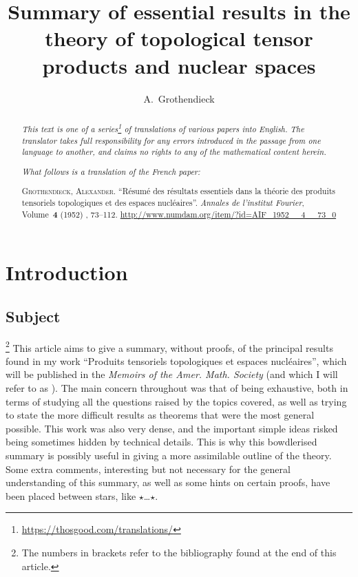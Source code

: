 \documentclass{article}
\title{Summary of essential results in the theory of topological tensor products and nuclear spaces}
\author{A.~Grothendieck}
\date{}
\theoremstyle{plain}
\newcommand{\aster}[1]{$\star${#1}$\star$}
\newcommand{\oldpage}[1]{\marginpar{\footnotesize$\Big\vert$ \textit{p.~#1}}}
\begin{document}
\maketitle
\thispagestyle{fancy}

\renewcommand{\abstractname}{Translator's note.}

\begin{abstract}
  \renewcommand*{\thefootnote}{\fnsymbol{footnote}}
  \emph{This text is one of a series\footnote{\url{https://thosgood.com/translations/}} of translations of various papers into English.}
  \emph{The translator takes full responsibility for any errors introduced in the passage from one language to another, and claims no rights to any of the mathematical content herein.}

  \medskip
  
  \emph{What follows is a translation of the French paper:}

  \medskip\noindent
  \textsc{Grothendieck, Alexander}.
  ``R\'{e}sum\'{e} des r\'{e}sultats essentiels dans la th\'{e}orie des produits tensoriels topologiques et des espaces nucl\'{e}aires''.
  \emph{Annales de l'institut Fourier}, Volume~\textbf{4} (1952) , 73--112.
  {\url{http://www.numdam.org/item/?id=AIF_1952__4__73_0}}
\end{abstract}

\setcounter{footnote}{0}

\tableofcontents
\bigskip



\section*{Introduction}
\label{section:introduction}
%


\subsection*{Subject}
\label{subsection:subject}
%

\oldpage{73}

\footnote{The numbers in brackets refer to the bibliography found at the end of this article.}
This article aims to give a summary, without proofs, of the principal results found in my work ``Produits tensoriels topologiques et espaces nucl\'{e}aires'', which will be published in the \emph{Memoirs of the Amer. Math. Society} (and which I will refer to as \cite{PTT}).
The main concern throughout \cite{PTT} was that of being exhaustive, both in terms of studying all the questions raised by the topics covered, as well as trying to state the more difficult results as theorems that were the most general possible.
This work was also very dense, and the important simple ideas risked being sometimes hidden by technical details.
This is why this bowdlerised summary is possibly useful in giving a more assimilable outline of the theory.
Some extra comments, interesting but not necessary for the general understanding of this summary, as well as some hints on certain proofs, have been placed between stars, like \aster{\ldots}.
\end{document}
